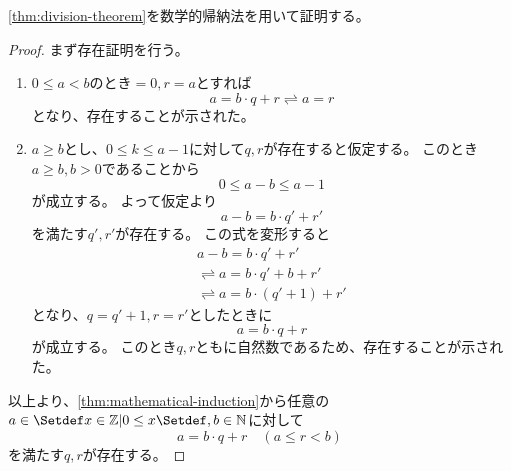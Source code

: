 \documentclass[uplatex, 11pt, a4j, dvipdfmx]{jsarticle}
\begin{document}
  \cref{thm:division-theorem}を数学的帰納法を用いて証明する。
  \begin{proof}
    まず存在証明を行う。
    \begin{enumerate}
      \item $0 \leq a < b$のとき$ = 0, r = a$とすれば
        \begin{equation}
         a = b \cdot q + r \rightleftharpoons a = r
        \end{equation}
        となり、存在することが示された。
      \item $a \geq b$とし、$0 \leq k \leq a - 1$に対して$q, r$が存在すると仮定する。
            このとき$a \geq b, b > 0$であることから
            \begin{equation}
              0 \leq a - b \leq a - 1
            \end{equation}
            が成立する。
            よって仮定より
            \begin{equation}
              a - b = b \cdot q' + r'
            \end{equation}
            を満たす$q', r'$が存在する。
            この式を変形すると
            \begin{equation} \begin{aligned}
              a - b = b \cdot q' + r' \\
              \rightleftharpoons a = b \cdot q' + b + r' \\
              \rightleftharpoons a = b \cdot (q' + 1) + r'
            \end{aligned} \end{equation}
            となり、$q = q' + 1, r = r'$としたときに
            \begin{equation}
              a  = b \cdot q + r
            \end{equation}
            が成立する。
            このとき$q, r$ともに自然数であるため、存在することが示された。
    \end{enumerate}
    以上より、\cref{thm:mathematical-induction}から任意の$a \in \Set{ x \in \Z | 0 \leq x }, b \in \N$に対して
    \begin{equation}
      a = b \cdot q + r \quad (a \leq r < b)
    \end{equation}
    を満たす$q, r$が存在する。


\end{proof}
\end{document}

